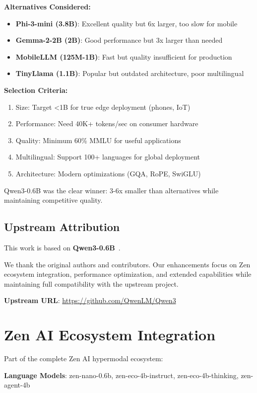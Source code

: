 \documentclass[11pt,a4paper]{article}
\begin{document}
\textbf{Alternatives Considered:}
\begin{itemize}
    \item \textbf{Phi-3-mini (3.8B)}: Excellent quality but 6x larger, too slow for mobile
    \item \textbf{Gemma-2-2B (2B)}: Good performance but 3x larger than needed
    \item \textbf{MobileLLM (125M-1B)}: Fast but quality insufficient for production
    \item \textbf{TinyLlama (1.1B)}: Popular but outdated architecture, poor multilingual
\end{itemize}

\textbf{Selection Criteria:}
\begin{enumerate}
    \item Size: Target <1B for true edge deployment (phones, IoT)
    \item Performance: Need 40K+ tokens/sec on consumer hardware
    \item Quality: Minimum 60\% MMLU for useful applications
    \item Multilingual: Support 100+ languages for global deployment
    \item Architecture: Modern optimizations (GQA, RoPE, SwiGLU)
\end{enumerate}

Qwen3-0.6B was the clear winner: 3-6x smaller than alternatives while maintaining competitive quality.

\subsection{Upstream Attribution}
This work is based on \textbf{Qwen3-0.6B}~\cite{upstream2025}.

We thank the original authors and contributors. Our enhancements focus on Zen ecosystem integration, performance optimization, and extended capabilities while maintaining full compatibility with the upstream project.

\textbf{Upstream URL}: \url{https://github.com/QwenLM/Qwen3}

\section{Zen AI Ecosystem Integration}

Part of the complete Zen AI hypermodal ecosystem:

\textbf{Language Models}: zen-nano-0.6b, zen-eco-4b-instruct, zen-eco-4b-thinking, zen-agent-4b
\end{document}
